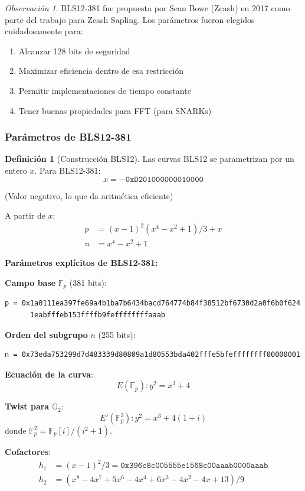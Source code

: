 \documentclass[11pt,a4paper,twoside,openright]{book}
\theoremstyle{definition}
\newtheorem{definition}{Definición}[chapter]
\theoremstyle{plain}
\theoremstyle{remark}
\newtheorem{remark}{Observación}[chapter]
\newcommand{\Fp}{\mathbb{F}_p}
\newcommand{\G}{\mathbb{G}}
\begin{document}
\begin{remark}
BLS12-381 fue propuesta por Sean Bowe (Zcash) en 2017 como parte del trabajo para Zcash Sapling. Los parámetros fueron elegidos cuidadosamente para:
\begin{enumerate}
    \item Alcanzar 128 bits de seguridad
    \item Maximizar eficiencia dentro de esa restricción
    \item Permitir implementaciones de tiempo constante
    \item Tener buenas propiedades para FFT (para SNARKs)
\end{enumerate}
\end{remark}

\subsubsection{Parámetros de BLS12-381}

\begin{definition}[Construcción BLS12]
Las curvas BLS12 se parametrizan por un entero $x$. Para BLS12-381:
\[ x = -\texttt{0xD201000000010000} \]

(Valor negativo, lo que da aritmética eficiente)

A partir de $x$:
\begin{align}
p &= (x-1)^2 (x^4 - x^2 + 1)/3 + x \\
n &= x^4 - x^2 + 1
\end{align}
\end{definition}

\begin{mathnote}
\textbf{Parámetros explícitos de BLS12-381:}

\textbf{Campo base} $\Fp$ (381 bits):
\begin{verbatim}
p = 0x1a0111ea397fe69a4b1ba7b6434bacd764774b84f38512bf6730d2a0f6b0f624
      1eabfffeb153ffffb9feffffffffaaab
\end{verbatim}

\textbf{Orden del subgrupo} $n$ (255 bits):
\begin{verbatim}
n = 0x73eda753299d7d483339d80809a1d80553bda402fffe5bfeffffffff00000001
\end{verbatim}

\textbf{Ecuación de la curva}:
\[ E(\Fp): y^2 = x^3 + 4 \]

\textbf{Twist para $\G_2$}:
\[ E'(\Fp^2): y^2 = x^3 + 4(1 + i) \]
donde $\Fp^2 = \Fp[i]/(i^2 + 1)$.

\textbf{Cofactores}:
\begin{align}
h_1 &= (x-1)^2/3 = \texttt{0x396c8c005555e1568c00aaab0000aaab} \\
h_2 &= (x^8 - 4x^7 + 5x^6 - 4x^4 + 6x^3 - 4x^2 - 4x + 13)/9
\end{align}
\end{mathnote}
\end{document}
